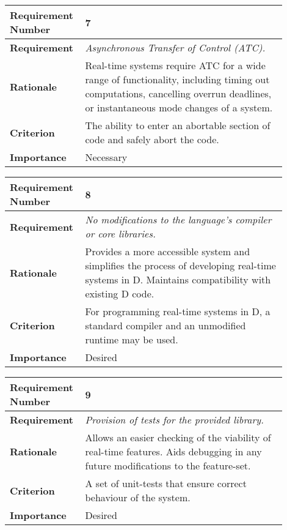 \begin{table}[!h]
\centering
\begin{tabular}{|L{0.2\linewidth}|L{0.7\linewidth}|}
\hline
\textbf{Requirement Number} & 7 \\ \hline
\textbf{Requirement} & \emph{Asynchronous Transfer of Control (ATC).} \\ \hline
\textbf{Rationale}      & Real-time systems require ATC for a wide range of functionality, 
                including timing out computations, cancelling overrun deadlines,  
                or instantaneous mode changes of a system. \\ \hline
\textbf{Criterion}      & The ability to enter an abortable section of code and
                safely abort the code. \\ \hline
\textbf{Importance}     & Necessary \\ \hline
\end{tabular}
\end{table}
\begin{table}[!h]
\centering
\begin{tabular}{|L{0.2\linewidth}|L{0.7\linewidth}|}
\hline
\textbf{Requirement Number} & 8 \\ \hline
\textbf{Requirement} & \emph{No modifications to the language's compiler or
core libraries.} \\ \hline
\textbf{Rationale}      & Provides a more accessible system and simplifies the  
                process of developing real-time systems in D. 
                Maintains compatibility with existing D code. \\ \hline
\textbf{Criterion}      & For programming real-time systems in D, a standard compiler and  
                an unmodified runtime may be used. \\ \hline
\textbf{Importance}     & Desired \\ \hline
\end{tabular}
\end{table}
\begin{table}[!h]
\centering
\begin{tabular}{|L{0.2\linewidth}|L{0.7\linewidth}|}
\hline
\textbf{Requirement Number}   & 9 \\ \hline
\textbf{Requirement} & \emph{Provision of tests for the provided library.} \\ \hline
\textbf{Rationale}      & Allows an easier checking of the viability of  
                real-time features. Aids debugging in any future 
                modifications to the feature-set. \\ \hline
\textbf{Criterion}      & A set of unit-tests that ensure correct behaviour of the system. \\ \hline
\textbf{Importance}     & Desired \\ \hline
\end{tabular}
\end{table}
